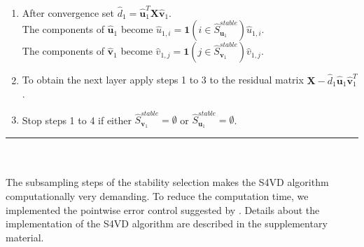 \begin{enumerate}
\begin{enumerate}
  \end{enumerate} 
  \item After convergence set $\hat{d}_{1}=\mathbf{\hat{u}}_{1}^{T}\mathbf{X}\mathbf{\hat{v}}_{1}$. \\
  The components of $\hat{\mathbf{u}}_{1}$ become $\hat{u}_{1,i}=\mathbf{1}(i \in \hat{S}_{\mathbf{u}_{1}}^{stable})\hat{u}_{1,i}$. \\
  The components of $\hat{\mathbf{v}}_{1}$ become $\hat{v}_{1,j}=\mathbf{1}(j \in \hat{S}_{\mathbf{v}_{1}}^{stable})\hat{v}_{1,j}$. 
 \item To obtain the next layer apply steps 1 to 3 to the residual matrix $\mathbf{X}-\hat{d}_{1}\mathbf{\hat{u}}_{1}\mathbf{\hat{v}}_{1}^{T}$. 
 \item Stop steps 1 to 4 if either $\hat{S}_{\mathbf{v}_{1}}^{stable}=\emptyset$ or $\hat{S}_{\mathbf{u}_{1}}^{stable}=\emptyset$.
\end{enumerate}
\hspace{-0.1cm} 
\rule{14.75 cm}{1pt}
\\
\\
The subsampling steps of the stability selection makes the S4VD algorithm computationally very demanding. To reduce the computation time, we implemented the pointwise error control suggested by \citet{Meinshausen2010}. Details about the implementation of the S4VD algorithm are described in the supplementary material.


